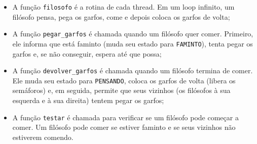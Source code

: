 \documentclass[10pt]{article}
\begin{document}
\begin{itemize}
\item A função \verb|filosofo| é a rotina de cada thread. Em um loop infinito, um filósofo pensa, pega os garfos, come e depois coloca os garfos de volta;
\item A função \verb|pegar_garfos| é chamada quando um filósofo quer comer. Primeiro, ele informa que está faminto (muda seu estado para \verb|FAMINTO|), tenta pegar os garfos e, se não conseguir, espera até que possa;
\item A função \verb|devolver_garfos| é chamada quando um filósofo termina de comer. Ele muda seu estado para \verb|PENSANDO|, coloca os garfos de volta (libera os semáforos) e, em seguida, permite que seus vizinhos (os filósofos à sua esquerda e à sua direita) tentem pegar os garfos;
\item A função \verb|testar| é chamada para verificar se um filósofo pode começar a comer. Um filósofo pode comer se estiver faminto e se seus vizinhos não estiverem comendo.
\end{itemize}
\nocite{*}
\printbibliography
\end{document}

